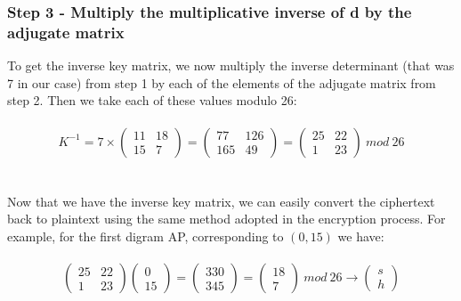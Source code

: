 \documentclass[Lau,binding=0.6cm,oneside]{sapthesis}
\begin{document}
\subsubsection{Step 3 - Multiply the multiplicative inverse of d by the adjugate matrix}
To get the inverse key matrix, we now multiply the inverse determinant (that was 7 in our case) from step 1 by each of the elements of the adjugate matrix from step 2. Then we take each of these values modulo 26:\\\\
\begin{equation}
K^{-1} = 7 \times \begin{pmatrix} 11 & 18 \\ 15 & 7 \end{pmatrix} =
\begin{pmatrix} 77 & 126 \\ 165 & 49 \end{pmatrix} = \begin{pmatrix} 25 & 22 \\ 1 & 23 \end{pmatrix} \ mod \ 26
\end{equation}
\ \\\\
Now that we have the inverse key matrix, we can easily convert the ciphertext back to plaintext using the same method adopted in the encryption process. For example, for the first digram \textsf{AP}, corresponding to $(0, 15)$ we have:\\\\
\begin{equation}
\begin{pmatrix} 25 & 22 \\ 1 & 23 \end{pmatrix} \begin{pmatrix} 0 \\ 15 \end{pmatrix} = 
\begin{pmatrix} 330 \\ 345 \end{pmatrix} = \begin{pmatrix} 18 \\ 7 \end{pmatrix} \ mod \ 26 \rightarrow \begin{pmatrix} s \\ h \end{pmatrix}
\end{equation}
\ \\\\
\end{document}
